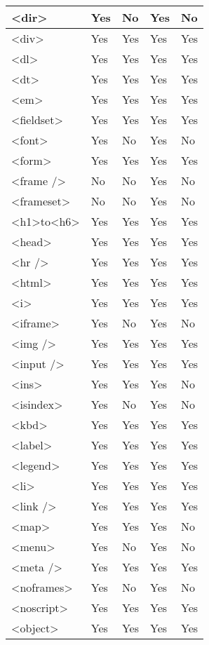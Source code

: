 \begin{longtable}{|l|l|l|l|l|}
\hline
<dir>				&Yes			&No		&Yes				&No		\\
\hline
<div>				&Yes			&Yes	&Yes				&Yes	\\
\hline
<dl>					&Yes			&Yes	&Yes				&Yes	\\
\hline
<dt>					&Yes			&Yes	&Yes				&Yes	\\
\hline
<em>				&Yes			&Yes	&Yes				&Yes	\\
\hline
<fieldset>			&Yes			&Yes	&Yes				&Yes	\\
\hline
<font>				&Yes			&No		&Yes				&No		\\
\hline
<form>				&Yes			&Yes	&Yes				&Yes	\\
\hline
<frame />				&No				&No		&Yes				&No		\\
\hline
<frameset>			&No				&No		&Yes				&No		\\
\hline
<h1>to<h6>			&Yes			&Yes	&Yes				&Yes	\\
\hline
<head>				&Yes			&Yes	&Yes				&Yes	\\
\hline
<hr />				&Yes			&Yes	&Yes				&Yes	\\
\hline
<html>				&Yes			&Yes	&Yes				&Yes	\\
\hline
<i>					&Yes			&Yes	&Yes				&Yes	\\
\hline
<iframe>				&Yes			&No		&Yes				&No		\\
\hline
<img />				&Yes			&Yes	&Yes				&Yes	\\
\hline
<input />				&Yes			&Yes	&Yes				&Yes	\\
\hline
<ins>				&Yes			&Yes	&Yes				&No		\\
\hline
<isindex>				&Yes			&No		&Yes				&No		\\
\hline
<kbd>				&Yes			&Yes	&Yes				&Yes	\\
\hline
<label>				&Yes			&Yes	&Yes				&Yes	\\
\hline
<legend>				&Yes			&Yes	&Yes				&Yes	\\
\hline
<li>					&Yes			&Yes	&Yes				&Yes	\\
\hline
<link />				&Yes			&Yes	&Yes				&Yes	\\
\hline
<map>				&Yes			&Yes	&Yes				&No		\\
\hline
<menu>				&Yes			&No		&Yes				&No		\\
\hline
<meta />				&Yes			&Yes	&Yes				&Yes	\\
\hline
<noframes>			&Yes			&No		&Yes				&No		\\
\hline
<noscript>			&Yes			&Yes	&Yes				&Yes	\\
\hline
<object>				&Yes			&Yes	&Yes				&Yes	\\

\end{longtable}
